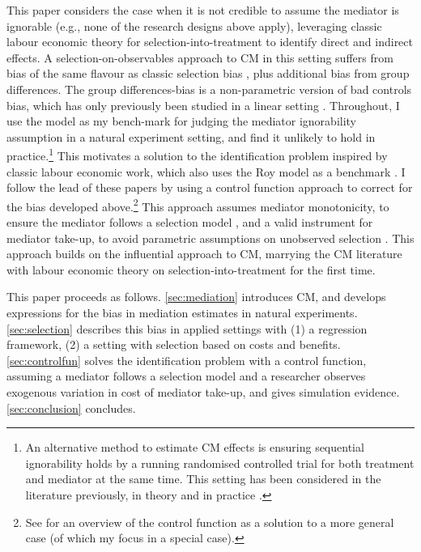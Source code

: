 This paper considers the case when it is not credible to assume the mediator is ignorable (e.g., none of the research designs above apply), leveraging classic labour economic theory for selection-into-treatment to identify direct and indirect effects.
A selection-on-observables approach to CM in this setting suffers from bias of the same flavour as classic selection bias \citep{heckman1998characterizing}, plus additional bias from group differences.
The group differences-bias is a non-parametric version of bad controls bias, which has only previously been studied in a linear setting \citep{cinelli2024crash,ding2015adjust}.
Throughout, I use the \cite{roy1951some} model as my bench-mark for judging the \cite{imai2010identification} mediator ignorability assumption in a natural experiment setting, and find it unlikely to hold in practice.\footnote{
    An alternative method to estimate CM effects is ensuring sequential ignorability holds by a running randomised controlled trial for both treatment and mediator at the same time.
    This setting has been considered in the literature previously, in theory \citep{imai2013experimental} and in practice \citep{ludwig2011mechanism}.
}
This motivates a solution to the identification problem inspired by classic labour economic work, which also uses the Roy model as a benchmark \citep{heckman1979sample,heckman1990empirical}.
I follow the lead of these papers by using a control function approach to correct for the bias developed above.\footnote{
    See \cite{imbens2007nonadditive} for an overview of the control function as a solution to a more general case (of which my focus in a special case).
}
This approach assumes mediator monotonicity, to ensure the mediator follows a selection model \citep{vytlacil2002independence}, and a valid instrument for mediator take-up, to avoid parametric assumptions on unobserved selection \citep{heckman2004using}.
This approach builds on the influential \cite{imai2010identification} approach to CM, marrying the CM literature with labour economic theory on selection-into-treatment for the first time. 

This paper proceeds as follows.
\autoref{sec:mediation} introduces CM, and develops expressions for the bias in mediation estimates in natural experiments.
\autoref{sec:selection} describes this bias in applied settings with (1) a regression framework, (2) a setting with selection based on costs and benefits.
\autoref{sec:controlfun} solves the identification problem with a control function, assuming a mediator follows a selection model and a researcher observes exogenous variation in cost of mediator take-up, and gives simulation evidence.
\autoref{sec:conclusion} concludes.
